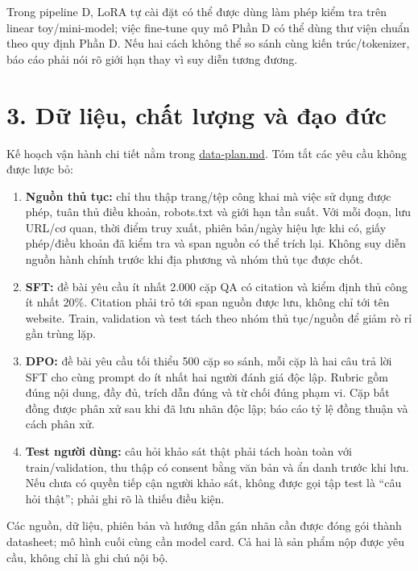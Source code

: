 \documentclass[11pt,a4paper]{article}
\providecommand{\tightlist}{\setlength{\itemsep}{0pt}\setlength{\parskip}{0pt}}
\begin{document}
Trong pipeline D, LoRA tự cài đặt có thể được dùng làm phép kiểm tra
trên linear toy/mini-model; việc fine-tune quy mô Phần D có thể dùng thư
viện chuẩn theo quy định Phần D. Nếu hai cách không thể so sánh cùng
kiến trúc/tokenizer, báo cáo phải nói rõ giới hạn thay vì suy diễn tương
đương.

\section{3. Dữ liệu, chất lượng và đạo
đức}\label{dux1eef-liux1ec7u-chux1ea5t-lux1b0ux1ee3ng-vuxe0-ux111ux1ea1o-ux111ux1ee9c}

Kế hoạch vận hành chi tiết nằm trong \href{data-plan.pdf}{data-plan.md}.
Tóm tắt các yêu cầu không được lược bỏ:

\begin{enumerate}
\def\labelenumi{\arabic{enumi}.}
\tightlist
\item
  \textbf{Nguồn thủ tục:} chỉ thu thập trang/tệp công khai mà việc sử
  dụng được phép, tuân thủ điều khoản, robots.txt và giới hạn tần suất.
  Với mỗi đoạn, lưu URL/cơ quan, thời điểm truy xuất, phiên bản/ngày
  hiệu lực khi có, giấy phép/điều khoản đã kiểm tra và span nguồn có thể
  trích lại. Không suy diễn nguồn hành chính trước khi địa phương và
  nhóm thủ tục được chốt.
\item
  \textbf{SFT:} đề bài yêu cầu ít nhất 2.000 cặp QA có citation và kiểm
  định thủ công ít nhất 20\%. Citation phải trỏ tới span nguồn được lưu,
  không chỉ tới tên website. Train, validation và test tách theo nhóm
  thủ tục/nguồn để giảm rò rỉ gần trùng lặp.
\item
  \textbf{DPO:} đề bài yêu cầu tối thiểu 500 cặp so sánh, mỗi cặp là hai
  câu trả lời SFT cho cùng prompt do ít nhất hai người đánh giá độc lập.
  Rubric gồm đúng nội dung, đầy đủ, trích dẫn đúng và từ chối đúng phạm
  vi. Cặp bất đồng được phân xử sau khi đã lưu nhãn độc lập; báo cáo tỷ
  lệ đồng thuận và cách phân xử.
\item
  \textbf{Test người dùng:} câu hỏi khảo sát thật phải tách hoàn toàn
  với train/validation, thu thập có consent bằng văn bản và ẩn danh
  trước khi lưu. Nếu chưa có quyền tiếp cận người khảo sát, không được
  gọi tập test là ``câu hỏi thật''; phải ghi rõ là thiếu điều kiện.
\end{enumerate}

Các nguồn, dữ liệu, phiên bản và hướng dẫn gán nhãn cần được đóng gói
thành datasheet; mô hình cuối cùng cần model card. Cả hai là sản phẩm
nộp được yêu cầu, không chỉ là ghi chú nội bộ.
\end{document}
